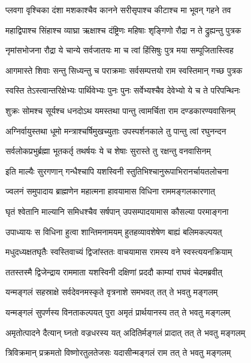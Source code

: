 \twolineshloka
{प्लवगा वृश्चिका दंशा मशकाश्चैव कानने}
{सरीसृपाश्च कीटाश्च मा भूवन् गहने तव} %

\twolineshloka
{महाद्विपाश्च सिंहाश्च व्याघ्रा ऋक्षाश्च दंष्ट्रिणः}
{महिषाः शृङ्गिणो रौद्रा न ते द्रुह्यन्तु पुत्रक} %

\twolineshloka
{नृमांसभोजना रौद्रा ये चान्ये सर्वजातयः}
{मा च त्वां हिंसिषुः पुत्र मया सम्पूजितास्त्विह} %

\twolineshloka
{आगमास्ते शिवाः सन्तु सिध्यन्तु च पराक्रमाः}
{सर्वसम्पत्तयो राम स्वस्तिमान् गच्छ पुत्रक} %

\twolineshloka
{स्वस्ति तेऽस्त्वान्तरिक्षेभ्यः पार्थिवेभ्यः पुनः पुनः}
{सर्वेभ्यश्चैव देवेभ्यो ये च ते परिपन्थिनः} %

\twolineshloka
{शुक्रः सोमश्च सूर्यश्च धनदोऽथ यमस्तथा}
{पान्तु त्वामर्चिता राम दण्डकारण्यवासिनम्} %

\twolineshloka
{अग्निर्वायुस्तथा धूमो मन्त्राश्चर्षिमुखच्युताः}
{उपस्पर्शनकाले तु पान्तु त्वां रघुनन्दन} %

\twolineshloka
{सर्वलोकप्रभुर्ब्रह्मा भूतकर्तृ तथर्षयः}
{ये च शेषाः सुरास्ते तु रक्षन्तु वनवासिनम्} %

\twolineshloka
{इति माल्यैः सुरगणान् गन्धैश्चापि यशस्विनी}
{स्तुतिभिश्चानुरूपाभिरानर्चायतलोचना} %

\twolineshloka
{ज्वलनं समुपादाय ब्राह्मणेन महात्मना}
{हावयामास विधिना राममङ्गलकारणात्} %

\twolineshloka
{घृतं श्वेतानि माल्यानि समिधश्चैव सर्षपान्}
{उपसम्पादयामास कौसल्या परमाङ्गना} %

\twolineshloka
{उपाध्यायः स विधिना हुत्वा शान्तिमनामयम्}
{हुतहव्यावशेषेण बाह्यं बलिमकल्पयत्} %

\twolineshloka
{मधुदध्यक्षतघृतैः स्वस्तिवाच्यं द्विजांस्ततः}
{वाचयामास रामस्य वने स्वस्त्ययनक्रियाम्} %

\twolineshloka
{ततस्तस्मै द्विजेन्द्राय राममाता यशस्विनी}
{दक्षिणां प्रददौ काम्यां राघवं चेदमब्रवीत्} %

\twolineshloka
{यन्मङ्गलं सहस्राक्षे सर्वदेवनमस्कृते}
{वृत्रनाशे समभवत् तत् ते भवतु मङ्गलम्} %

\twolineshloka
{यन्मङ्गलं सुपर्णस्य विनताकल्पयत् पुरा}
{अमृतं प्रार्थयानस्य तत् ते भवतु मङ्गलम्} %

\twolineshloka
{अमृतोत्पादने दैत्यान् घ्नतो वज्रधरस्य यत्}
{अदितिर्मङ्गलं प्रादात् तत् ते भवतु मङ्गलम्} %

\twolineshloka
{त्रिविक्रमान् प्रक्रमतो विष्णोरतुलतेजसः}
{यदासीन्मङ्गलं राम तत् ते भवतु मङ्गलम्} %

